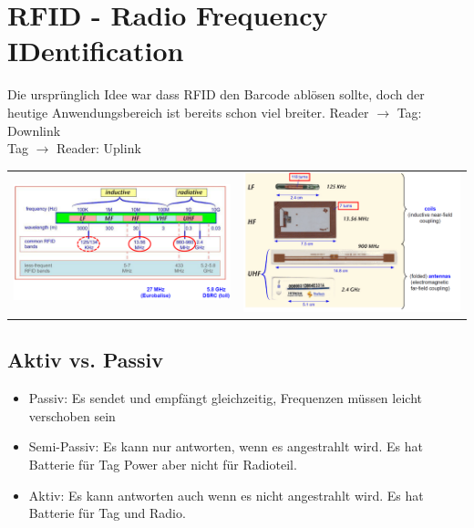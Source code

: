 
\section{RFID - Radio Frequency IDentification}
Die ursprünglich Idee war dass RFID den Barcode ablösen sollte, doch der heutige Anwendungsbereich ist bereits schon viel breiter.
Reader $\rightarrow$ Tag: Downlink \\
Tag $\rightarrow$ Reader: Uplink

\begin{tabular}[h]{c c}

\parbox{8cm}{
    \includegraphics[width=8cm]{./bilder/RFIDFrequenzen.png} } 
&

\parbox{8cm}{
    \includegraphics[width=8cm]{./bilder/RFIDTags.png} } \\
\end{tabular}
\subsection{Aktiv vs. Passiv}
	\begin{itemize}
		\item Passiv: Es sendet und empfängt gleichzeitig, Frequenzen müssen leicht verschoben sein
		\item Semi-Passiv: Es kann nur antworten, wenn es angestrahlt wird. Es hat Batterie für Tag Power aber nicht für Radioteil. 
		\item Aktiv: Es kann antworten auch wenn es nicht angestrahlt wird. Es hat Batterie für Tag und Radio. 
	\end{itemize}
